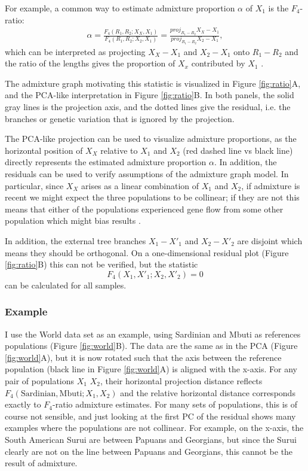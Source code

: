 \documentclass[12pt,fullpage, a4paper]{article}
\newcommand{\vectorproj}[2][]{\textit{proj}_{#1}#2}
\begin{document}
For example, a common way to estimate admixture proportion $\alpha$ of $X_1$ is the $F_4$-ratio:
\begin{eqnarray}
\alpha = \frac{F_4(R_1, R_2; X_X, X_1)}{F_4(R_1, R_2; X_2, X_1)} = \frac{\vectorproj[R_1 - R_2]{X_X - X_1}}{\vectorproj[R_1 - R_2]{X_2 - X_1}} \label{eq:f4ratio},
\end{eqnarray}
which can be interpreted as projecting $X_X-X_1$ and $X_2-X_1$ onto $R_1 - R_2$ and the ratio of the lengths gives the proportion of $X_x$ contributed by $X_1$  \citep{oteo-garcia2021}. 

The admixture graph motivating this statistic is visualized in Figure \ref{fig:ratio}A, and the PCA-like interpretation in Figure \ref{fig:ratio}B. In both panels, the solid gray lines is the projection axis, and the dotted lines give the residual, i.e. the branches or genetic variation that is ignored by the projection. 

The PCA-like projection can be used to visualize admixture proportions, as the horizontal position of $X_X$ relative to $X_1$ and $X_2$ (red dashed line vs black line) directly represents the estimated admixture proportion $\alpha$. In addition, the residuals can be used to verify assumptions of the admixture graph model. In particular, since $X_X$ arises as a linear combination of $X_1$ and $X_2$, if admixture is recent we might expect the three populations to be collinear; if they are not this means that either of the populations experienced gene flow from some other population which might bias results \citep{petr2019}.


In addition, the external tree branches $X_1 - X'_1$ and $X_2 - X'_2$ are disjoint which means they should be orthogonal. On a one-dimensional residual plot (Figure \ref{fig:ratio}B) this can not be verified, but the statistic 
\begin{equation}
F_4(X_1, X'_1; X_2, X'_2) = 0
\end{equation}
can be calculated for all samples.

\subsubsection{Example}
I use the World data set as an example, using Sardinian and Mbuti as references populations (Figure \ref{fig:world}B). The data are the same as in  the PCA (Figure \ref{fig:world}A), but it is now rotated such that the axis between the reference population (black line in Figure \ref{fig:world}A) is aligned with the x-axis. For any pair of populations $X_1$ $X_2$, their horizontal projection distance reflects $F_4(\text{Sardinian}, \text{Mbuti}; X_1, X_2)$ and the relative horizontal distance corresponds exactly to $F_4$-ratio admixture estimates. For many sets of populations, this is of course not sensible, and just looking at the first PC of the residual shows many examples where the populations are not collinear. For example, on the x-axis, the South American Surui are between Papuans and Georgians, but since the Surui clearly are not on the line between Papuans and Georgians, this cannot be the result of admixture.
\end{document}
